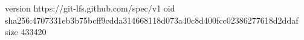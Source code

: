 version https://git-lfs.github.com/spec/v1
oid sha256:4707331eb3b75bcff9cdda314668118d073a40c8d400fcc02386277618d2ddaf
size 433420
